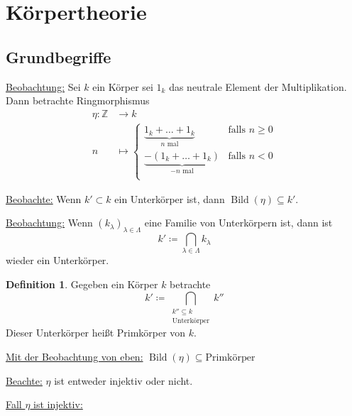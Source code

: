 \documentclass[12pt,parskip=full]{scrartcl}
\newcommand{\setZ}{\mathbb{Z}}
\newcommand{\setQ}{\mathbb{Q}}
\newcommand{\heading}{\underline}
\theoremstyle{definition}
\newtheorem{definition}[theorem]{Definition}
\theoremstyle{remark}
\begin{document}
	\section{Körpertheorie}
	
	\subsection{Grundbegriffe}
	
	\heading{Beobachtung:} Sei $k$ ein Körper sei $1_k$ das neutrale Element der Multiplikation. Dann betrachte Ringmorphismus
	\begin{align*}
		\eta: \setZ &\to k \\
		n &\mapsto \begin{cases}
			\underbrace{1_k + \dots + 1_k}_\text{$n$ mal} & \text{falls } n \geq 0 \\
			\underbrace{-(1_k + \dots + 1_k)}_\text{$-n$ mal} & \text{falls } n < 0 \\
		\end{cases}
	\end{align*}
	
	\heading{Beobachte:} Wenn $k' \subset k$ ein Unterkörper ist, dann $\operatorname{Bild}(\eta) \subseteq k'$.
	
	\heading{Beobachtung:} Wenn $(k_\lambda)_{\lambda \in \Lambda}$ eine Familie von Unterkörpern ist, dann ist
	\begin{equation*}
		k' \coloneqq \bigcap_{\lambda \in \Lambda} k_\lambda
	\end{equation*}
	wieder ein Unterkörper.
	
	\begin{definition}
		Gegeben ein Körper $k$ betrachte
		\begin{equation*}
			k' \coloneqq \bigcap_{\substack{k'' \subseteq k \\ \text{Unterkörper}}} k''
		\end{equation*}
		Dieser Unterkörper heißt Primkörper von $k$.
	\end{definition}

	\heading{Mit der Beobachtung von eben:} $\operatorname{Bild}(\eta) \subseteq \text{Primkörper}$
	
	\heading{Beachte:} $\eta$ ist entweder injektiv oder nicht.
	
	\heading{Fall $\eta$ ist injektiv:}
	
	\begin{center}
	\end{center}
\end{document}
